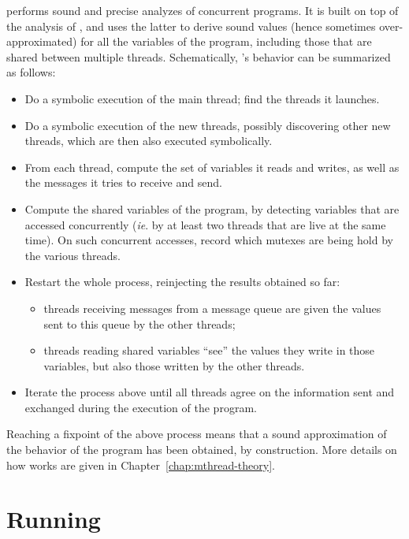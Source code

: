 \documentclass{frama-c-book}
\def\ie.{\emph{ie}.}
\def\mychap#1{Chapter~{\ref{chap:#1}}}
\begin{document}
\mthread performs sound and precise analyzes of concurrent
programs. It is built on top of the \Eva analysis of \FramaC, and uses
the latter to derive sound values (hence sometimes over-approximated) for
all the variables of the program, including those that are shared
between multiple threads. Schematically, \mthread's behavior can be summarized as
follows:
\begin{itemize}
\item Do a symbolic execution of the main thread; find the threads
  it launches.

\item Do a symbolic execution of the new threads, possibly discovering
  other new threads, which are then also executed symbolically.

\item From each thread, compute the set of variables it reads
  and writes, as well as the messages it tries to receive and send.

\item Compute the shared variables of the program, by detecting
  variables that are accessed concurrently (\ie. by at least two
  threads that are live at the same time). On such concurrent
  accesses, record which mutexes are being hold by the various threads.

\item Restart the whole process, reinjecting the results obtained so far:
  \begin{itemize}
  \item threads receiving messages from a message queue are given the
    values sent to this queue by the other threads;

  \item threads reading shared variables ``see'' the values they write
    in those variables, but also those written by the other threads.

  \end{itemize}

\item Iterate the process above until all threads agree on the
  information sent and exchanged during the execution of the program.
\end{itemize}

Reaching  a fixpoint of the above process means that a sound approximation
of the behavior of the program has been obtained, by construction.
More details on how \mthread works are given in \mychap{mthread-theory}.


\section{Running \mthread}
\end{document}
